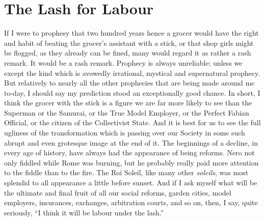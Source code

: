\documentclass{book}
\begin{document}
\chapter{The Lash for Labour}
\label{chapter-7}
If I were to prophesy that two hundred years hence a grocer would have the right and habit of beating the grocer’s assistant with a stick, or that shop girls might be flogged, as they already can be fined, many would regard it as rather a rash remark. It would be a rash remark. Prophecy is always unreliable; unless we except the kind which is avowedly irrational, mystical and supernatural prophecy. But relatively to nearly all the other prophecies that are being made around me to-day, I should say my prediction stood an exceptionally good chance. In short, I think the grocer with the stick is a figure we are far more likely to see than the Superman or the Samurai, or the True Model Employer, or the Perfect Fabian Official, or the citizen of the Collectivist State. And it is best for us to see the full ugliness of the transformation which is passing over our Society in some such abrupt and even grotesque image at the end of it. The beginnings of a decline, in every age of history, have always had the appearance of being reforms. Nero not only fiddled while Rome was burning, but he probably really paid more attention to the fiddle than to the fire. The Roi Soleil, like many other \emph{soleils}, was most splendid to all appearance a little before sunset. And if I ask myself what will be the ultimate and final fruit of all our social reforms, garden cities, model employers, insurances, exchanges, arbitration courts, and so on, then, I say, quite seriously, “I think it will be labour under the lash.”
\end{document}
